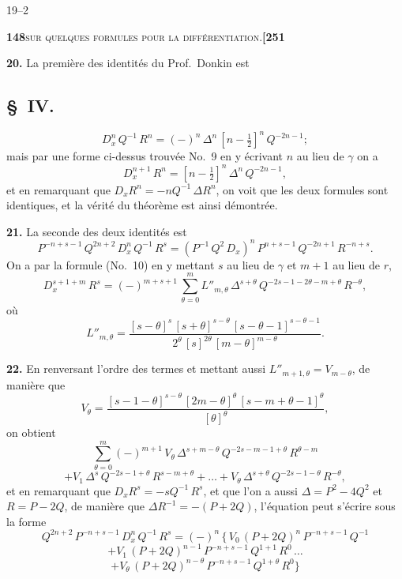\documentclass[11pt]{article}
\begin{document}
\hfill 19--2

\newpage

\noindent\textbf{148}\hfill\textsc{sur quelques formules pour la différentiation.}\hfill\textbf{[251}

\medskip

\textbf{20.} La première des identités du Prof.~Donkin est

\subsection*{§~IV.}

\[
D_x^n\,Q^{-1}\,R^n = (-)^n\,\Delta^n\,[n - \tfrac{1}{2}]^n\,Q^{-2n-1};
\]
mais par une forme ci-dessus trouvée No.~9 en y écrivant $n$ au lieu de $\gamma$ on a
\[
D_x^{n+1}\,R^{n} = [n - \tfrac{1}{2}]^{n}\,\Delta^{n}\,Q^{-2n-1},
\]
et en remarquant que $D_x R^{n} = -nQ^{-1}\,\Delta R^{n}$, on voit que les deux formules sont identiques, et la vérité du théorème est ainsi démontrée.

\medskip

\textbf{21.} La seconde des deux identités est
\[
P^{-n+s-1}\,Q^{2n+2}\,D_x^n\,Q^{-1}\,R^s = (P^{-1}\,Q^2\,D_x)^n\,P^{n+s-1}\,Q^{-2n+1}\,R^{-n+s}.
\]
On a par la formule (No.~10) en y mettant $s$ au lieu de $\gamma$ et $m + 1$ au lieu de $r$,
\[
D_x^{s+1+m}\,R^{s} = (-)^{m+s+1}\,\sum_{\theta=0}^{m} L''_{m,\theta}\,\Delta^{s+\theta}\,Q^{-2s-1-2\theta-m+\theta}\,R^{-\theta},
\]
où
\[
L''_{m,\theta} = \frac{[s - \theta]^{s}\,[s + \theta]^{s-\theta}\,[s - \theta - 1]^{s-\theta-1}}{2^{\theta}\,[s]^{2\theta}\,[m - \theta]^{m-\theta}}.
\]

\medskip

\textbf{22.} En renversant l'ordre des termes et mettant aussi $L''_{m+1,\theta} = V_{m-\theta}$, de manière que
\[
V_{\theta} = \frac{[s - 1 - \theta]^{s-\theta}\,[2m - \theta]^{\theta}\,[s - m + \theta - 1]^{\theta}}{[\theta]^{\theta}},
\]
on obtient
\[
\sum_{\theta=0}^{m} (-)^{m+1}\,V_{\theta}\,\Delta^{s+m-\theta}\,Q^{-2s-m-1+\theta}\,R^{\theta-m}
\]
\[
+ V_1\,\Delta^{s}\,Q^{-2s-1+\theta}\,R^{s-m+\theta} + \ldots + V_{\theta}\,\Delta^{s+\theta}\,Q^{-2s-1-\theta}\,R^{-\theta},
\]
et en remarquant que $D_x R^s = -sQ^{-1}\,R^s$, et que l'on a aussi $\Delta = P^2 - 4Q^2$ et $R = P - 2Q$, de manière que $\Delta R^{-1} = -(P + 2Q)$, l'équation peut s'écrire sous la forme
\[
Q^{2n+2}\,P^{-n+s-1}\,D_x^n\,Q^{-1}\,R^s = (-)^n\,\bigl\{\,V_0\,(P + 2Q)^n\,P^{-n+s-1}\,Q^{-1}
\]
\[
+ V_1\,(P + 2Q)^{n-1}\,P^{-n+s-1}\,Q^{1+1}\,R^0\,\ldots
\]
\[
+ V_{\theta}\,(P + 2Q)^{n-\theta}\,P^{-n+s-1}\,Q^{1+\theta}\,R^{0}\bigr\}
\]
\end{document}
